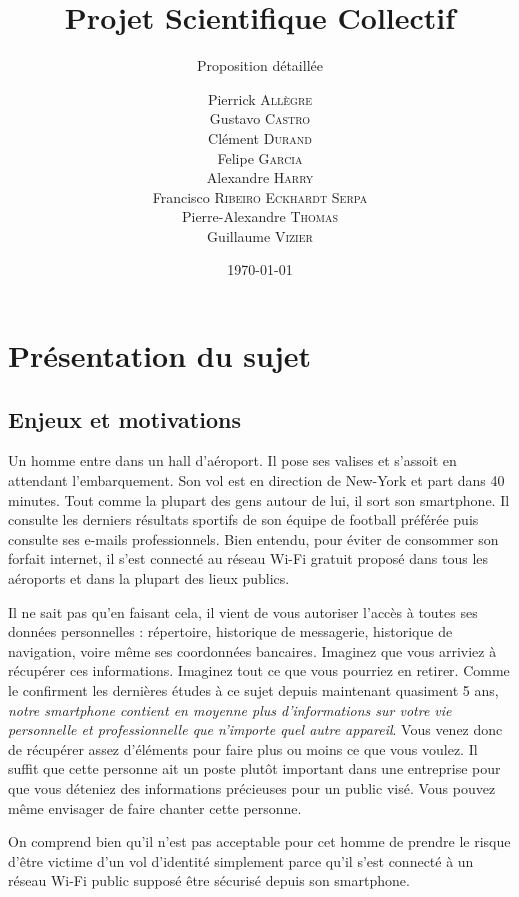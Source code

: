 \documentclass[a4paper, 12pt,twoside]{article}
\title{Projet Scientifique Collectif}
\author{Pierrick \textsc{Allègre} \\
		Gustavo \textsc{Castro} \\
		Clément \textsc{Durand} \\
		Felipe \textsc{Garcia} \\
		Alexandre \textsc{Harry} \\
		Francisco \textsc{Ribeiro Eckhardt Serpa} \\
		Pierre-Alexandre \textsc{Thomas} \\
		Guillaume \textsc{Vizier} \\}
\subtitle{Proposition détaillée}
\date{\today}
\begin{document}
\maketitle
\renewcommand{\baselinestretch}{1.1}
\setlength{\parskip}{0.5em}
\tableofcontents\clearpage



\section{Présentation du sujet}
	
	\subsection{Enjeux et motivations}
	
	Un homme entre dans un hall d'aéroport. Il pose ses valises et s'assoit en attendant l'embarquement. Son vol est en direction de New-York et part dans 40 minutes. Tout comme la plupart des gens autour de lui, il sort son smartphone. %
Il consulte %
les derniers résultats sportifs de son équipe de football préférée puis consulte ses e-mails professionnels. Bien entendu, pour éviter de consommer son forfait internet, il s'est connecté au réseau \newcommand{\wifi}{Wi-Fi} \wifi{} gratuit proposé dans tous les aéroports et dans la plupart des lieux publics.
		
	Il ne sait pas qu'en faisant cela, il vient de vous autoriser l'accès à toutes ses données personnelles : répertoire, historique de messagerie, historique de navigation, voire même ses coordonnées bancaires. Imaginez que vous arriviez à récupérer ces informations. Imaginez tout ce que vous pourriez en retirer. Comme le confirment les dernières études à ce sujet depuis maintenant quasiment 5 ans, \emph{notre smartphone contient en moyenne plus d'informations sur votre vie personnelle et professionnelle que n'importe quel autre appareil}. Vous venez donc de récupérer assez d'éléments pour faire plus ou moins ce que vous voulez. Il suffit que cette personne ait un poste plutôt important dans une entreprise pour que vous déteniez des informations précieuses pour un public visé. Vous pouvez même envisager de faire chanter cette personne.
		
	On comprend bien qu'il n'est pas acceptable pour cet homme de prendre le risque d'être victime d'un vol d'identité simplement parce qu'il s'est connecté à un réseau \wifi{} public supposé être sécurisé depuis son smartphone.
		
\end{document}
